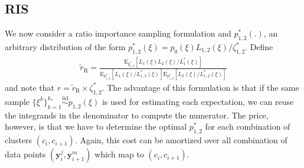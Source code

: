 \subsection{RIS}
We now consider a ratio importance sampling formulation and $p_{1,2}^*(.)$, an arbitrary distribution of the form $p_{1,2}^*(\xi)=p_0(\xi)L_{1,2}(\xi)/\zeta_{1,2}^*$. Define
\begin{align}
\tilde{r}_{\mathrm{R}}=\frac{\mathrm{E}_{p_{1,2}^*}[L_{1}(\xi)L_{2}(\xi)/L_{1}^*(\xi)]}{\mathrm{E}_{p_{1,2}^*}[L_{1}(\xi)/L_{1,2}^*(\xi)]\mathrm{E}_{p_{1,2}^*}[L_{2}(\xi)/L_{1,2}^*(\xi)]}
\end{align}and note that $r=\tilde{r}_{\mathrm{R}}\times \zeta_{1,2}^*$. The advantage of this formulation is that if the same sample $\{\xi^k\}_{k=1}^{k_*}\stackrel{\mathrm{iid}}{\sim} p_{1,2}(\xi)$ is used for estimating each expectation, we can reuse the integrands in the denominator to compute the numerator. The price, however, is that we have to determine the optimal $p_{1,2}^*$ for each combination of clusters $(c_i,c_{i+1})$. Again, this cost can be amortized over all combination of data points $(\mathbf{y}_i^j,\mathbf{y}_{i+1}^m)$ which map to $(c_i,c_{i+1})$.






